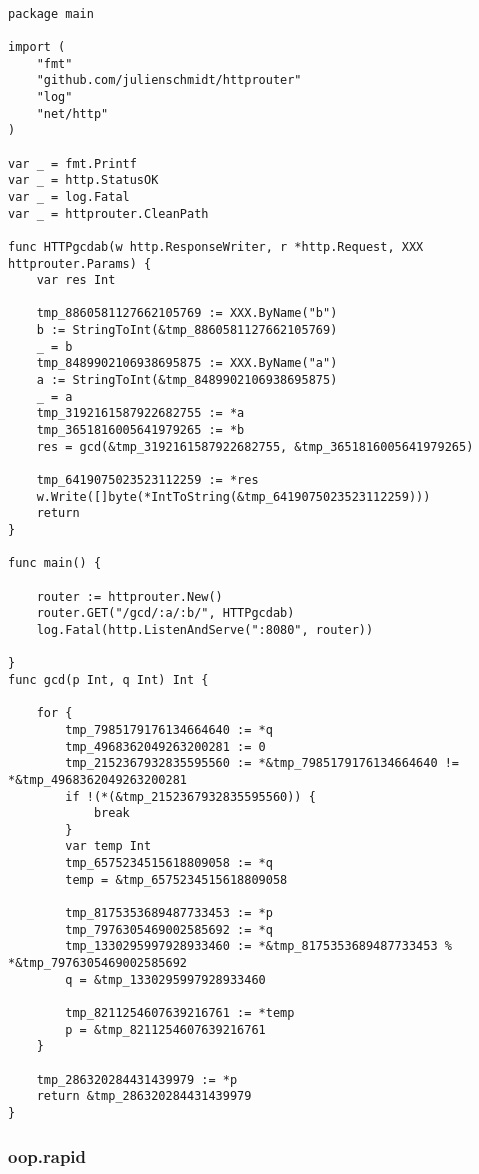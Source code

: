 \begin{verbatim}

package main

import (
    "fmt"
    "github.com/julienschmidt/httprouter"
    "log"
    "net/http"
)

var _ = fmt.Printf
var _ = http.StatusOK
var _ = log.Fatal
var _ = httprouter.CleanPath

func HTTPgcdab(w http.ResponseWriter, r *http.Request, XXX httprouter.Params) {
    var res Int

    tmp_8860581127662105769 := XXX.ByName("b")
    b := StringToInt(&tmp_8860581127662105769)
    _ = b
    tmp_8489902106938695875 := XXX.ByName("a")
    a := StringToInt(&tmp_8489902106938695875)
    _ = a
    tmp_3192161587922682755 := *a
    tmp_3651816005641979265 := *b
    res = gcd(&tmp_3192161587922682755, &tmp_3651816005641979265)

    tmp_6419075023523112259 := *res
    w.Write([]byte(*IntToString(&tmp_6419075023523112259)))
    return
}

func main() {

    router := httprouter.New()
    router.GET("/gcd/:a/:b/", HTTPgcdab)
    log.Fatal(http.ListenAndServe(":8080", router))

}
func gcd(p Int, q Int) Int {

    for {
        tmp_7985179176134664640 := *q
        tmp_4968362049263200281 := 0
        tmp_2152367932835595560 := *&tmp_7985179176134664640 != *&tmp_4968362049263200281
        if !(*(&tmp_2152367932835595560)) {
            break
        }
        var temp Int
        tmp_6575234515618809058 := *q
        temp = &tmp_6575234515618809058

        tmp_8175353689487733453 := *p
        tmp_7976305469002585692 := *q
        tmp_1330295997928933460 := *&tmp_8175353689487733453 % *&tmp_7976305469002585692
        q = &tmp_1330295997928933460

        tmp_8211254607639216761 := *temp
        p = &tmp_8211254607639216761
    }

    tmp_286320284431439979 := *p
    return &tmp_286320284431439979
}

\end{verbatim}

\subsubsection*{oop.rapid}

